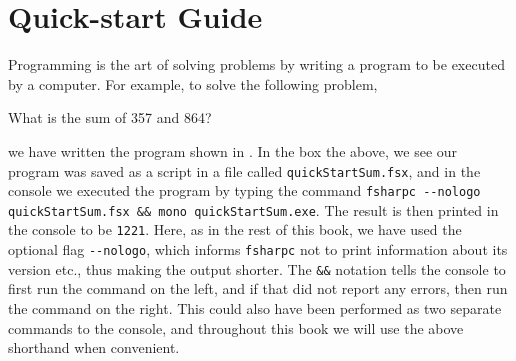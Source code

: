 \documentclass[springer.tex]{subfiles}
\begin{document}
\chapter{Quick-start Guide}
Programming is the art of solving problems by writing a program to be executed by a computer. For example, to solve the following problem,
%
\begin{task}
  What is the sum of 357 and 864?
  \label{probl:sumInteger}
\end{task}
%
we have written the program shown in .
%
%
In the box the above, we see our program was saved as a script in a file called \lstinline[language=console]{quickStartSum.fsx}, and in the console we executed the program by typing the command \lstinline[language=console]|fsharpc --nologo quickStartSum.fsx && mono quickStartSum.exe|. The result is then printed in the console to be \lstinline{1221}. Here, as in the rest of this book, we have used the optional flag \lstinline[language=console]{--nologo}, which informs \lstinline|fsharpc| not to print information about its version etc., thus making the output shorter. The \lstinline[language=console]{&&} notation tells the console to first run the command on the left, and if that did not report any errors, then run the command on the right. This could also have been performed as two separate commands to the console, and throughout this book we will use the above shorthand when convenient.
\end{document}
